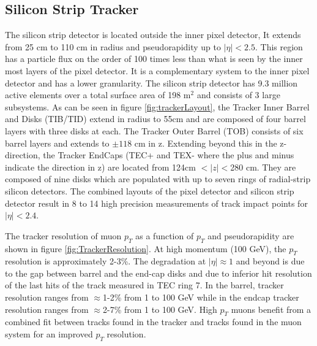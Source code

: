 \subsection{Silicon Strip Tracker}
The silicon strip detector is located outside the inner pixel detector, 
It extends from 25 cm to 110 cm in radius and pseudorapidity up to $|\eta|<2.5$. 
This region has a particle flux on 
the order of 100 times less than what is seen by the inner most layers of 
the pixel detector. It is a complementary system to the inner pixel
detector and has a lower granularity. The silicon strip detector 
has 9.3 million active elements over a total surface area of 198 m$^{2}$
and consists of 3 large subsystems. As can be seen in figure \ref{fig:trackerLayout}, 
the Tracker Inner Barrel and Disks (TIB/TID) extend in radius to
55cm and are composed of four barrel layers with three disks at each.
The Tracker Outer Barrel (TOB) consists of six barrel layers and extends to $\pm118$ cm
in z. Extending beyond this in the z-direction, the Tracker EndCaps (TEC+ and TEX- where the plus and minus
indicate the direction in z) are located from 124cm $<|z|<$280 cm. They are composed of 
nine disks which are populated with up to seven rings of radial-strip silicon detectors.
The combined layouts of the pixel detector and silicon strip detector
result in 8 to 14 high precision measurements of track impact points for 
$|\eta|<2.4$.

The tracker resolution of muon $p_{T}$ as a function of $p_{T}$ and pseudorapidity are 
shown in figure \ref{fig:TrackerResolution}.
At high momentum (100 GeV), the $p_{T}$ resolution is approximately 2-3\%. The degradation at
$|\eta|\approx 1$ and beyond is due to the gap between barrel and the end-cap disks
and due to inferior hit resolution of the last hits of the track measured in TEC ring 7. 
In the barrel, tracker resolution ranges from $\approx$1-2\% from 1 to 100 GeV while
in the endcap tracker resolution ranges from $\approx$2-7\% from 1 to 100 GeV. High
$p_{T}$ muons benefit from a combined fit between tracks found in the tracker and
 tracks found in the muon system for an improved $p_{T}$ resolution.

